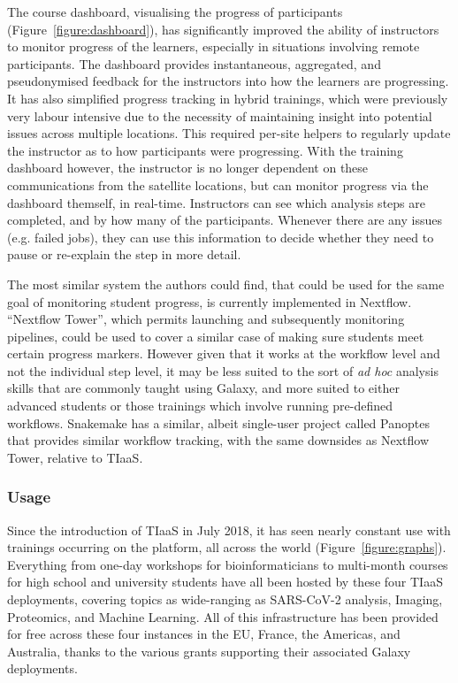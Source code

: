 \documentclass[a4paper,num-refs]{oup-contemporary}
\begin{document}
The course dashboard, visualising the progress of participants (Figure~\ref{figure:dashboard}), has significantly improved the ability of instructors to monitor progress of the learners, especially in situations involving remote participants. The dashboard provides instantaneous, aggregated, and pseudonymised feedback for the instructors into how the learners are progressing. It has also simplified progress tracking in hybrid trainings, which were previously very labour intensive due to the necessity of maintaining insight into potential issues across multiple locations. This required per-site helpers to regularly update the instructor as to how participants were progressing. With the training dashboard however, the instructor is no longer dependent on these communications from the satellite locations, but can monitor progress via the dashboard themself, in real-time. Instructors can see which analysis steps are completed, and by how many of the participants. Whenever there are any issues (e.g. failed jobs), they can use this information to decide whether they need to pause or re-explain the step in more detail.

The most similar system the authors could find, that could be used for the same goal of monitoring student progress, is currently implemented in Nextflow. ``Nextflow Tower''\cite{nf-tower}, which permits launching and subsequently monitoring pipelines, could be used to cover a similar case of making sure students meet certain progress markers. However given that it works at the workflow level and not the individual step level, it may be less suited to the sort of \textit{ad hoc} analysis skills that are commonly taught using Galaxy, and more suited to either advanced students or those trainings which involve running pre-defined workflows. Snakemake has a similar, albeit single-user project called Panoptes that provides similar workflow tracking\cite{panoptes}, with the same downsides as Nextflow Tower, relative to TIaaS.

\subsubsection{Usage}
Since the introduction of TIaaS in July 2018, it has seen nearly constant use with  trainings occurring on the platform, all across the world (Figure~\ref{figure:graphs}).
Everything from one-day workshops for bioinformaticians to multi-month courses for high school and university students have all been hosted by these four TIaaS deployments, covering topics as wide-ranging as SARS-CoV-2 analysis, Imaging, Proteomics, and Machine Learning. All of this infrastructure has been provided for free across these four instances in the EU, France, the Americas, and Australia, thanks to the various grants supporting their associated Galaxy deployments.
\end{document}
